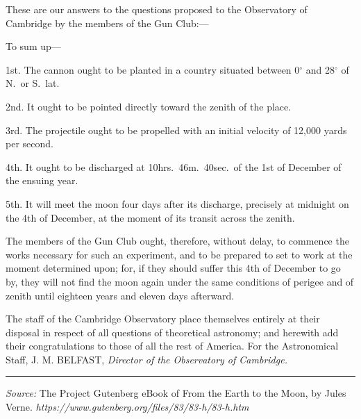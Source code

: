 \documentclass[a4paper]{article}
\newcommand{\texturl}[1]{\textit{#1}}
\newcommand{\source}[2]{%
  \par\noindent\rule{\textwidth}{0.4pt}
  \emph{#1:} #2}
\begin{document}
These are our answers to the questions proposed to the Observatory of Cambridge
by the members of the Gun Club:---

To sum up---

1st. The cannon ought to be planted in a country situated between 0$^\circ$ and
28$^\circ$ of N.\ or S.\ lat.

2nd. It ought to be pointed directly toward the zenith of the place.

3rd. The projectile ought to be propelled with an initial velocity of 12,000
yards per second.

4th. It ought to be discharged at 10hrs.\ 46m.\ 40sec.\ of the 1st of December
of the ensuing year.

5th. It will meet the moon four days after its discharge, precisely at midnight
on the 4th of December, at the moment of its transit across the zenith.

The members of the Gun Club ought, therefore, without delay, to commence the
works necessary for such an experiment, and to be prepared to set to work at
the moment determined upon; for, if they should suffer this 4th of December to
go by, they will not find the moon again under the same conditions of perigee
and of zenith until eighteen years and eleven days afterward.

The staff of the Cambridge Observatory place themselves entirely at their
disposal in respect of all questions of theoretical astronomy; and herewith add
their congratulations to those of all the rest of America. For the Astronomical
Staff, J. M. BELFAST, \emph{Director of the Observatory of Cambridge.}

\source{Source}{%
  The Project Gutenberg eBook of From the Earth to the Moon, by
  Jules Verne. \texturl{https://www.gutenberg.org/files/83/83-h/83-h.htm}}
\end{document}
